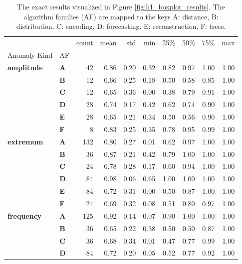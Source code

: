 \begin{table}
\centering
\caption{The exact results visualized in Figure \ref{fig:h1_boxplot_results}. The algorithm families (AF) are mapped to the keys A: distance, B: distribution, C: encoding, D: forecasting, E: reconstruction, F: trees.}
\label{tab:h1_boxplot_results}
\begin{tabular}{llrrrrrrrr}
\toprule
 &  & count & mean & std & min & 25\% & 50\% & 75\% & max \\
Anomaly Kind & AF &  &  &  &  &  &  &  &  \\
\midrule
\multirow[t]{6}{*}{\textbf{amplitude}} & \textbf{A} & 42 & 0.86 & 0.20 & 0.32 & 0.82 & 0.97 & 1.00 & 1.00 \\
\textbf{} & \textbf{B} & 12 & 0.66 & 0.25 & 0.18 & 0.50 & 0.58 & 0.85 & 1.00 \\
\textbf{} & \textbf{C} & 12 & 0.65 & 0.36 & 0.00 & 0.38 & 0.79 & 0.91 & 1.00 \\
\textbf{} & \textbf{D} & 28 & 0.74 & 0.17 & 0.42 & 0.62 & 0.74 & 0.90 & 1.00 \\
\textbf{} & \textbf{E} & 28 & 0.65 & 0.21 & 0.34 & 0.50 & 0.56 & 0.90 & 1.00 \\
\textbf{} & \textbf{F} & 8 & 0.83 & 0.25 & 0.35 & 0.78 & 0.95 & 0.99 & 1.00 \\
\cline{1-10}
\multirow[t]{6}{*}{\textbf{extremum}} & \textbf{A} & 132 & 0.80 & 0.27 & 0.01 & 0.62 & 0.97 & 1.00 & 1.00 \\
\textbf{} & \textbf{B} & 36 & 0.87 & 0.21 & 0.42 & 0.79 & 1.00 & 1.00 & 1.00 \\
\textbf{} & \textbf{C} & 24 & 0.78 & 0.28 & 0.17 & 0.60 & 0.94 & 1.00 & 1.00 \\
\textbf{} & \textbf{D} & 84 & 0.98 & 0.06 & 0.65 & 1.00 & 1.00 & 1.00 & 1.00 \\
\textbf{} & \textbf{E} & 84 & 0.72 & 0.31 & 0.00 & 0.50 & 0.87 & 1.00 & 1.00 \\
\textbf{} & \textbf{F} & 24 & 0.69 & 0.32 & 0.08 & 0.51 & 0.80 & 0.97 & 1.00 \\
\cline{1-10}
\multirow[t]{6}{*}{\textbf{frequency}} & \textbf{A} & 125 & 0.92 & 0.14 & 0.07 & 0.90 & 1.00 & 1.00 & 1.00 \\
\textbf{} & \textbf{B} & 36 & 0.65 & 0.22 & 0.38 & 0.50 & 0.50 & 0.87 & 1.00 \\
\textbf{} & \textbf{C} & 36 & 0.68 & 0.34 & 0.01 & 0.47 & 0.77 & 0.99 & 1.00 \\
\textbf{} & \textbf{D} & 84 & 0.72 & 0.20 & 0.05 & 0.52 & 0.77 & 0.92 & 1.00 \\

\end{tabular}
\end{table}
